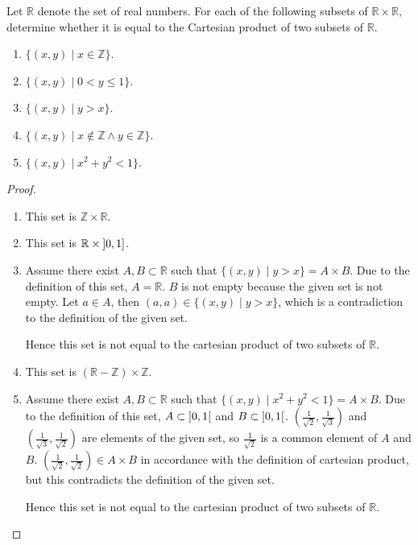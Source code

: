\begin{exercise}\label{chapter1:section1:exercise10}
    Let $\mathbb{R}$ denote the set of real numbers. For each of the following subsets of $\mathbb{R}\times\mathbb{R}$, determine whether it is equal to the Cartesian product of two subsets of $\mathbb{R}$.
    \begin{enumerate}[label={(\alph*)}]
        \item $\{ (x, y) \mid x\in\mathbb{Z} \}$.
        \item $\{ (x, y) \mid 0 < y \leq 1 \}$.
        \item $\{ (x, y) \mid y > x \}$.
        \item $\{ (x, y) \mid x\notin \mathbb{Z} \land y\in\mathbb{Z} \}$.
        \item $\{ (x, y) \mid x^{2} + y^{2} < 1 \}$.
    \end{enumerate}
\end{exercise}

\begin{proof}
    \begin{enumerate}[label={(\alph*)}]
        \item This set is $\mathbb{Z}\times\mathbb{R}$.
        \item This set is $\mathbb{R}\times \left]{0, 1}\right]$.
        \item Assume there exist $A, B\subset\mathbb{R}$ such that $\{ (x, y) \mid y > x \} = A\times B$. Due to the definition of this set, $A = \mathbb{R}$. $B$ is not empty because the given set is not empty. Let $a\in A$, then $(a, a)\in \{ (x, y) \mid y > x \}$, which is a contradiction to the definition of the given set.

              Hence this set is not equal to the cartesian product of two subsets of $\mathbb{R}$.
        \item This set is $(\mathbb{R} - \mathbb{Z})\times \mathbb{Z}$.
        \item Assume there exist $A, B\subset\mathbb{R}$ such that $\{ (x, y) \mid x^{2} + y^{2} < 1 \} = A\times B$. Due to the definition of this set, $A\subset \left]{0, 1}\right[$ and $B\subset \left]{0, 1}\right[$. $\left(\frac{1}{\sqrt{2}}, \frac{1}{\sqrt{3}}\right)$ and $\left(\frac{1}{\sqrt{3}}, \frac{1}{\sqrt{2}}\right)$ are elements of the given set, so $\frac{1}{\sqrt{2}}$ is a common element of $A$ and $B$. $\left(\frac{1}{\sqrt{2}}, \frac{1}{\sqrt{2}}\right)\in A\times B$ in accordance with the definition of cartesian product, but this contradicts the definition of the given set.

              Hence this set is not equal to the cartesian product of two subsets of $\mathbb{R}$.
    \end{enumerate}
\end{proof}

